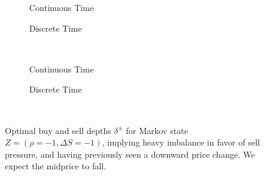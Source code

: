 \begin{figure}
\centering
\begin{subfigure}{.35\linewidth}
  \centering
  \setlength\figureheight{\linewidth} 
  \setlength\figurewidth{\linewidth}
  
  \caption{Continuous Time}
\end{subfigure}%
\hfil%
\begin{subfigure}{.35\linewidth}
  \centering
  \setlength\figureheight{\linewidth}
  \setlength\figurewidth{\linewidth}
   
  \caption{Discrete Time}
\end{subfigure}\\
\vspace{1cm}
\begin{subfigure}{.35\linewidth}
  \centering
  \setlength\figureheight{\linewidth} 
  \setlength\figurewidth{\linewidth}
  
  \caption{Continuous Time}
\end{subfigure}%
\hfil%
\begin{subfigure}{.35\linewidth}
  \centering
  \setlength\figureheight{\linewidth}
  \setlength\figurewidth{\linewidth}
   
  \caption{Discrete Time}
\end{subfigure}\\
\vspace{1cm}
\begin{subfigure}{\linewidth}
  \centering
   
\end{subfigure}%
  \caption{Optimal buy and sell depths $\delta^{\pm}$ for Markov state $Z=(\rho = -1, \Delta S = -1)$, implying heavy imbalance in favor of sell pressure, and having previously seen a downward price change. We expect the midprice to fall.}
  \label{fig:comp_dm_z1}
\end{figure}

